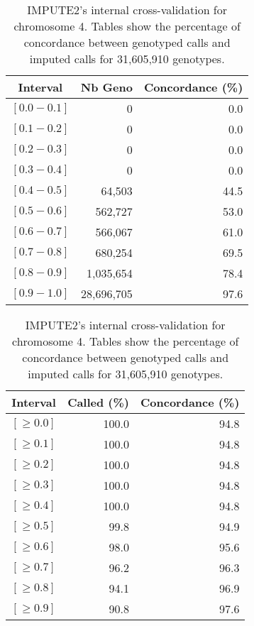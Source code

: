 \documentclass[10pt,twoside,english]{scrartcl}
\begin{document}
\begin{table}[H]
\protect\caption{IMPUTE2's internal cross-validation for chromosome 4. Tables show the
percentage of concordance between genotyped calls and imputed calls
for 31,605,910 genotypes.\label{tab:cross_validation_chr_4}}

\centering

\begin{tabular}{crr}
\hline 
\multicolumn{1}{c}{\textbf{Interval}}
 & \multicolumn{1}{c}{\textbf{Nb Geno}}
 & \multicolumn{1}{c}{\textbf{Concordance (\%)}}
\\
\hline 

$[0.0-0.1]$ & 0 & 0.0\\
$[0.1-0.2]$ & 0 & 0.0\\
$[0.2-0.3]$ & 0 & 0.0\\
$[0.3-0.4]$ & 0 & 0.0\\
$[0.4-0.5]$ & 64,503 & 44.5\\
$[0.5-0.6]$ & 562,727 & 53.0\\
$[0.6-0.7]$ & 566,067 & 61.0\\
$[0.7-0.8]$ & 680,254 & 69.5\\
$[0.8-0.9]$ & 1,035,654 & 78.4\\
$[0.9-1.0]$ & 28,696,705 & 97.6\\
\hline 
\end{tabular}
\hfill
\begin{tabular}{crr}
\hline 
\multicolumn{1}{c}{\textbf{Interval}}
 & \multicolumn{1}{c}{\textbf{Called (\%)}}
 & \multicolumn{1}{c}{\textbf{Concordance (\%)}}
\\
\hline 

$[\geq 0.0]$ & 100.0 & 94.8\\
$[\geq 0.1]$ & 100.0 & 94.8\\
$[\geq 0.2]$ & 100.0 & 94.8\\
$[\geq 0.3]$ & 100.0 & 94.8\\
$[\geq 0.4]$ & 100.0 & 94.8\\
$[\geq 0.5]$ & 99.8 & 94.9\\
$[\geq 0.6]$ & 98.0 & 95.6\\
$[\geq 0.7]$ & 96.2 & 96.3\\
$[\geq 0.8]$ & 94.1 & 96.9\\
$[\geq 0.9]$ & 90.8 & 97.6\\
\hline 
\end{tabular}


\end{table}
\end{document}

